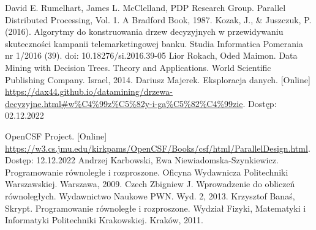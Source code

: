 \documentclass[12pt]{article}
\begin{document}
\cleardoublepage
{}
{}
\begin{thebibliography}{20}

     David E. Rumelhart, James L. McClelland, PDP Research Group. Parallel Distributed Processing, Vol. 1. A Bradford Book, 1987.
     Kozak, J., \& Juszczuk, P. (2016). Algorytmy do konstruowania drzew decyzyjnych w przewidywaniu skuteczności kampanii telemarketingowej banku. Studia Informatica Pomerania nr 1/2016 (39). doi: 10.18276/si.2016.39-05
     Lior Rokach, Oded Maimon. Data Mining with Decision Trees. Theory and Applications. World Scientific Publishing Company. Israel, 2014.
     Dariusz Majerek. Eksploracja danych. [Online] \url{https://dax44.github.io/datamining/drzewa-decyzyjne.html#w%C4%99z%C5%82y-i-ga%C5%82%C4%99zie}. Dostęp: 02.12.2022
   
     OpenCSF Project. [Online] \url{https://w3.cs.jmu.edu/kirkpams/OpenCSF/Books/csf/html/ParallelDesign.html}. Dostęp: 12.12.2022
     Andrzej Karbowski, Ewa Niewiadomska-Szynkiewicz. Programowanie równoległe i rozproszone. Oficyna Wydawnicza Politechniki Warszawskiej. Warszawa, 2009.
     Czech Zbigniew J. Wprowadzenie do obliczeń równoległych. Wydawnictwo Naukowe PWN. Wyd. 2, 2013.
     Krzysztof Banaś, Skrypt. Programowanie równoległe i rozproszone. Wydział Fizyki, Matematyki i Informatyki Politechniki Krakowskiej. Kraków, 2011.


\end{thebibliography}
\end{document}
